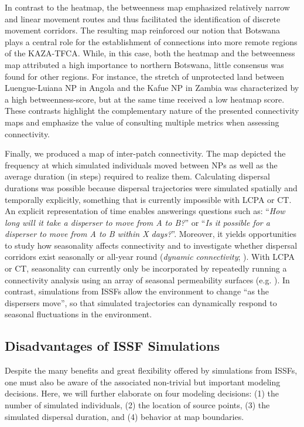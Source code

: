 \documentclass[abstract=on,10pt,a4paper,bibliography=totocnumbered]{article}
\begin{document}
In contrast to the heatmap, the betweenness map emphasized relatively narrow and
linear movement routes and thus facilitated the identification of discrete
movement corridors. The resulting map reinforced our notion that Botswana plays
a central role for the establishment of connections into more remote regions of
the KAZA-TFCA. While, in this case, both the heatmap and the betweenness map
attributed a high importance to northern Botswana, little consensus was found
for other regions. For instance, the stretch of unprotected land between
Luengue-Luiana NP in Angola and the Kafue NP in Zambia was characterized by a
high betweenness-score, but at the same time received a low heatmap score. These
contrasts highlight the complementary nature of the presented connectivity maps
and emphasize the value of consulting multiple metrics when assessing
connectivity.

Finally, we produced a map of inter-patch connectivity. The map depicted the
frequency at which simulated individuals moved between NPs as well as the
average duration (in steps) required to realize them. Calculating dispersal
durations was possible because dispersal trajectories were simulated spatially
and temporally explicitly, something that is currently impossible with LCPA or
CT. An explicit representation of time enables answerings questions such as:
``\textit{How long will it take a disperser to move from A to B?}'' or
``\textit{Is it possible for a disperser to move from A to B within X days?}''.
Moreover, it yields opportunities to study how seasonality affects connectivity
and to investigate whether dispersal corridors exist seasonally or all-year
round (\textit{dynamic connectivity}; \citealp{Zeller.2020}). With LCPA or CT,
seasonality can currently only be incorporated by repeatedly running a
connectivity analysis using an array of seasonal permeability surfaces (e.g.
\citealp{Benz.2016, Osipova.2019}). In contrast, simulations from ISSFs allow
the environment to change ``as the dispersers move'', so that simulated
trajectories can dynamically respond to seasonal fluctuations in the
environment.

\subsection{Disadvantages of ISSF Simulations}
Despite the many benefits and great flexibility offered by simulations from
ISSFs, one must also be aware of the associated non-trivial but important
modeling decisions. Here, we will further elaborate on four modeling decisions:
(1) the number of simulated individuals, (2) the location of source points, (3)
the simulated dispersal duration, and (4) behavior at map boundaries.
\end{document}
